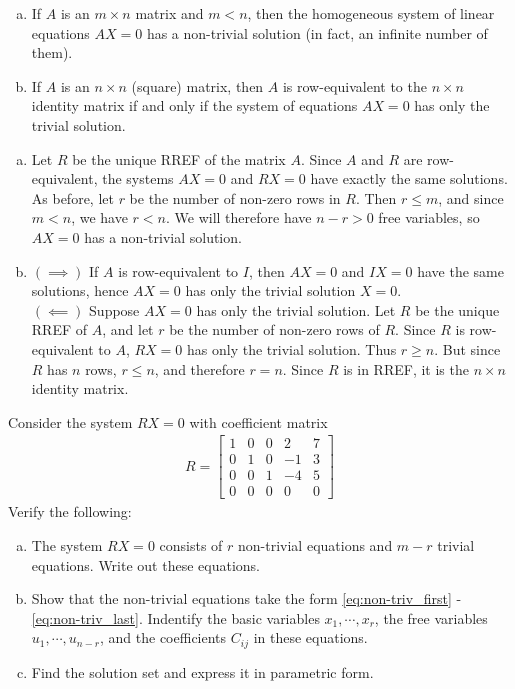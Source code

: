 \documentclass[12pt,letterpaper,reqno]{article}
\numberwithin{equation}{section}
\begin{document}
\begin{thm}\label{thm:solution_sets_of_homogeneous_linear_systems} \hspace{10cm}
	\begin{enumerate}[(a)]
		\item If $A$ is an $m \times n$ matrix and $m<n$, then the homogeneous system of linear equations $AX=0$ has a non-trivial solution (in fact, an infinite number of them). 
		\item If $A$ is an $n \times n$ (square) matrix, then $A$ is row-equivalent to the $n \times n$ identity matrix if and only if the system of equations $AX=0$ has only the trivial solution.
	\end{enumerate}
\end{thm}

\begin{pf}
	\begin{enumerate}[(a)]
		\item Let $R$ be the unique RREF of the matrix $A$. Since $A$ and $R$ are row-equivalent, the systems $AX=0$ and $RX=0$ have exactly the same solutions. As before, let $r$ be the number of non-zero rows in $R$. Then $r \leq m$, and since $m < n$, we have $r<n$. We will therefore have $n-r>0$ free variables, so $AX=0$ has a non-trivial solution. 
		\item $(\implies)$ If $A$ is row-equivalent to $I$, then $AX=0$ and $IX=0$ have the same solutions, hence $AX=0$ has only the trivial solution $X=0$. \\
		$(\impliedby)$ Suppose $AX=0$ has only the trivial solution. Let $R$ be the unique RREF of $A$, and let $r$ be the number of non-zero rows of $R$. Since $R$ is row-equivalent to $A$, $RX=0$ has only the trivial solution. Thus $r \geq n$. But since $R$ has $n$ rows, $r \leq n$, and therefore $r=n$. Since $R$ is in RREF, it is the $n \times n$ identity matrix.
	\end{enumerate}
\end{pf}
\begin{exercise}
Consider the system $RX=0$ with coefficient matrix
\begin{align*}
	R=\begin{bmatrix}
		1&0&0&2&7 \\
		0&1&0&-1&3 \\
		0&0&1&-4&5 \\
		0&0&0&0&0 
	\end{bmatrix}
\end{align*}
Verify the following:
\begin{enumerate}[(a)]
	\item The system $RX=0$ consists of $r$ non-trivial equations and $m-r$ trivial equations. Write out these equations.
	\item Show that the non-trivial equations take the form \eqref{eq:non-triv_first} - \eqref{eq:non-triv_last}. Indentify the basic variables $x_1,\cdots,x_r$, the free variables $u_1,\cdots,u_{n-r}$, and the coefficients $C_{ij}$ in these equations.
	\item Find the solution set and express it in parametric form.
\end{enumerate}	
\end{exercise}
\end{document}
